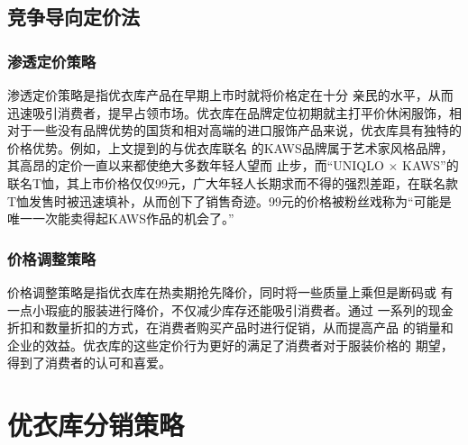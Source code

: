 \documentclass{xjtureport}
\begin{document}
\subsection{竞争导向定价法}
\subsubsection{渗透定价策略}
渗透定价策略是指优衣库产品在早期上市时就将价格定在十分
亲民的水平，从而迅速吸引消费者，提早占领市场。优衣库在品牌定位初期就主打平价休闲服饰，相对于一些没有品牌优势的国货和相对高端的进口服饰产品来说，优衣库具有独特的价格优势。例如，上文提到的与优衣库联名
的KAWS品牌属于艺术家风格品牌，其高昂的定价一直以来都使绝大多数年轻人望而
止步，而“UNIQLO $\times$ KAWS”的联名T恤，其上市价格仅仅99元，\cite{ref13}广大年轻人长期求而不得的强烈差距，在联名款T恤发售时被迅速填补，从而创下了销售奇迹。99元的价格被粉丝戏称为“可能是唯一一次能卖得起KAWS作品的机会了。”\cite{ref16}
\subsubsection{价格调整策略}
价格调整策略是指优衣库在热卖期抢先降价，同时将一些质量上乘但是断码或
有一点小瑕疵的服装进行降价，不仅减少库存还能吸引消费者。通过
一系列的现金折扣和数量折扣的方式，在消费者购买产品时进行促销，从而提高产品
的销量和企业的效益。优衣库的这些定价行为更好的满足了消费者对于服装价格的
期望，得到了消费者的认可和喜爱。
\section{优衣库分销策略}
\end{document}
